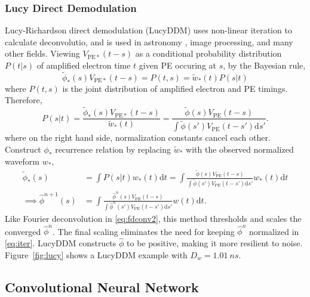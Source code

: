 \subsubsection{Lucy Direct Demodulation}

Lucy-Richardson direct demodulation (LucyDDM) uses non-linear iteration to calculate deconvolutio, and is used in astronomy \cite{li_richardson-lucy_2019}, image processing, and many other fields.  Viewing $V_{\mathrm{PE}*}(t-s)$ as a conditional probability distribution $P(t|s)$ of amplified electron time $t$ given PE occuring at $s$, by the Bayesian rule,
\begin{equation}
  \label{eq:lucy}
  \tilde{\phi}_*(s) V_{\mathrm{PE}*}(t-s) = P(t,s) = \tilde{w}_*(t)P(s|t)
\end{equation}
where $P(t,s)$ is the joint distribution of amplified electron and PE timings.  Therefore,
\begin{equation}
  \label{eq:ptt}
  P(s|t) = \frac{\tilde{\phi}_*(s) V_{\mathrm{PE}*}(t-s)}{\tilde{w}_*(t)} = \frac{\tilde{\phi}(s) V_{\mathrm{PE}}(t-s)}{\int\tilde{\phi}(s') V_{\mathrm{PE}}(t-s')\mathrm{d}s'}.
\end{equation}
where on the right hand side, normalization constants cancel each other. Construct $\phi_*$ recurrence relation by replacing $\tilde{w}_*$ with the observed normalized waveform $w_*$,
\begin{equation}
  \label{eq:iter}
  \begin{aligned}
    \tilde{\phi}_*(s) & = \int P(s|t) w_*(t)\mathrm{d}t =  \int \frac{\tilde{\phi}(s) V_{\mathrm{PE}}(t-s)}{\int\tilde{\phi}(s') V_{\mathrm{PE}}(t-s')\mathrm{d}s'} w_*(t) \mathrm{d}t \\
    \implies \hat{\phi}^{n+1}(s) & = \int \frac{\hat{\phi}^n(s) V_{\mathrm{PE}}(t-s)}{\int\hat{\phi}^n(s') V_{\mathrm{PE}}(t-s')\mathrm{d}s'} w(t) \mathrm{d}t.
  \end{aligned}
\end{equation}
Like Fourier deconvolution in \eqref{eq:fdconv2}, this method thresholds and scales the converged $\hat{\phi}^{n}$.  The final scaling eliminates the need for keeping $\hat{\phi}^{n}$ normalized in \eqref{eq:iter}.  LucyDDM constructs $\hat{\phi}$ to be positive, making it more resilient to noise.  Figure~\ref{fig:lucy} shows a LucyDDM example with $D_w = \SI{1.01}{ns}$.

\subsection{Convolutional Neural Network}

